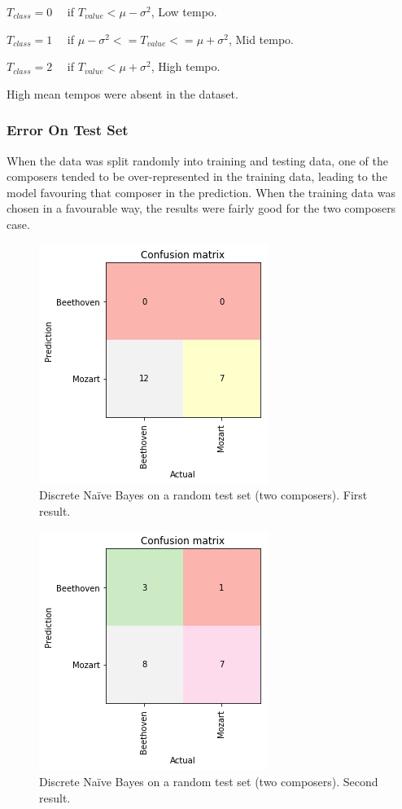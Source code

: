 \documentclass[11pt]{article}
\makeatletter
\def\maxwidth{\ifdim\Gin@nat@width>\linewidth\linewidth
    \else\Gin@nat@width\fi}
\let\Oldincludegraphics\includegraphics
\renewcommand{\includegraphics}[1]{\Oldincludegraphics[width=.8\maxwidth]{#1}}
\makeatother
\begin{document}
\(T_{class} = 0 \quad\) if \(T_{value} < \mu - \sigma^2\), Low tempo.

\(T_{class} = 1 \quad\) if
\(\mu - \sigma^2 <= T_{value} <= \mu + \sigma^2\), Mid tempo.

\(T_{class} = 2 \quad\) if \(T_{value} < \mu + \sigma^2\), High tempo.

High mean tempos were absent in the dataset.

\subsubsection{Error On Test Set}\label{error-on-test-set}

When the data was split randomly into training and testing data, one of
the composers tended to be over-represented in the training data,
leading to the model favouring that composer in the prediction. When the
training data was chosen in a favourable way, the results were fairly
good for the two composers case.

\begin{figure}[htbp]
\centering
\includegraphics{report/plots/confusion_discNB_01.png}
\caption{Discrete Naïve Bayes on a random test set (two composers).
First result.}
\end{figure}

\begin{figure}[htbp]
\centering
\includegraphics{report/plots/confusion_discNB_01b.png}
\caption{Discrete Naïve Bayes on a random test set (two composers).
Second result.}
\end{figure}
\end{document}
